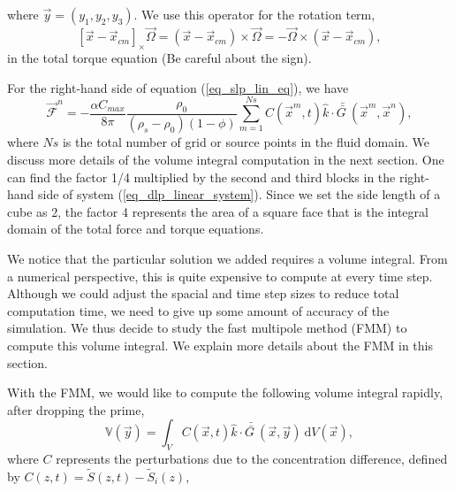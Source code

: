  where $\vec{y} = (y_1, y_2, y_3).$
We use this operator for the rotation term, 
 \[
  [\vec{x} - \vec{x}_{cm}]_{\times}  \vec{\Omega}
   = (\vec{x} - \vec{x}_{cm}) \times \vec{\Omega}
  = - \vec{\Omega} \times  (\vec{x} - \vec{x}_{cm}),
  \]
  in the total torque equation (Be careful about the sign).
  \par
   For the right-hand side of equation (\ref{eq_slp_lin_eq}), we have
   \[
   {\vec{\mathcal{F}}}^n = 
   -\frac{ \alpha C_{max}}{8\pi } \frac{\rho_0}{(\rho_s - \rho_0)(1-\phi)} 
  \sum_{m= 1}^{Ns}  C \left(\vec{x}^m,  t \right) \hat{k} \cdot
  \bar{\bar{G \ }}(\vec{x}^m, \vec{x}^n ),
   \]
   where $Ns$ is the total number of grid or source points in the fluid domain. We discuss more details of the volume integral computation in the next section. 
  One can find the factor 1/4 multiplied by the second and third blocks in the right-hand side of system (\ref{eq_dlp_linear_system}). 
 Since we set the side length of a cube as 2, the factor 4 represents the area of a square face that is the integral domain of the total force and torque equations.
\par
We notice that the particular solution we added requires a volume integral. From a numerical perspective, this is quite expensive to compute at every time step. Although we could adjust the spacial and time step sizes to reduce total computation time, we need to give up some amount of accuracy of the simulation. We thus decide to study the fast multipole method (FMM) to compute this volume integral. We explain more details about the FMM in this section. 
\par
With the FMM, we would like to compute the following volume integral rapidly, after dropping the prime,  
\begin{equation}
\mathbb{V}(\vec{y}) = 
 \int_{V} 
	C (\vec{x},t ) \hat{k} \cdot 
	\bar{\bar{G \ }} (\vec{x}, \vec{y} ) 
	\ \text{d}V(\vec{x}),
	\label{eq_vol_int}
\end{equation}
where $C$ represents the perturbations due to the concentration difference, defined by $C(z,t) = \tilde{S}(z,t) - \tilde{S}_i(z)$,
